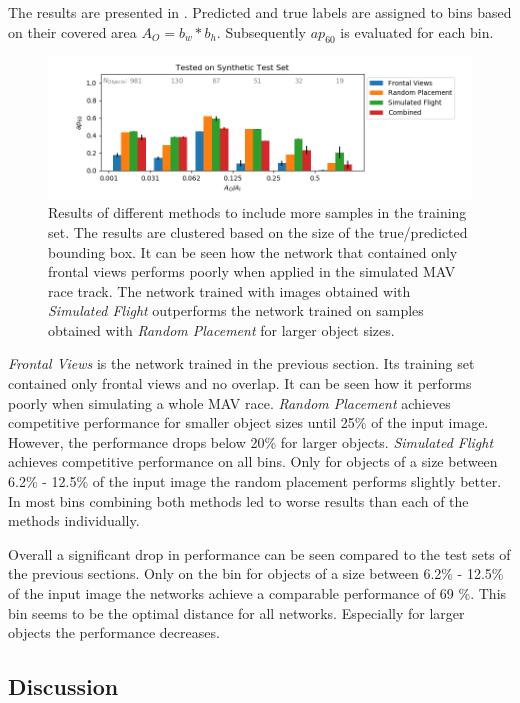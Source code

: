 The results are presented in . Predicted and true labels are assigned to bins based on their covered area $A_O=b_w*b_h$. Subsequently $ap_{60}$ is evaluated for each bin. 
	\begin{figure}[hbtp]
	\includegraphics[width=\textwidth]{fig/view_size}
	\caption{Results of different methods to include more samples in the training set. The results are clustered based on the size of the true/predicted bounding box. It can be seen how the network that contained only frontal views performs poorly when applied in the simulated \ac{MAV} race track. The network trained with images obtained with \textit{Simulated Flight} outperforms the network trained on samples obtained with \textit{Random Placement} for larger object sizes.}
	\label{fig:view_size}
\end{figure}


\textit{Frontal Views} is the network trained in the previous section. Its training set contained only frontal views and no overlap. It can be seen how it performs poorly when simulating a whole \ac{MAV} race. \textit{Random Placement} achieves competitive performance for smaller object sizes until 25\% of the input image. However, the performance drops below 20\% for larger objects. \textit{Simulated Flight} achieves competitive performance on all bins. Only for objects of a size between 6.2\% - 12.5\% of the input image the random placement performs slightly better. In most bins combining both methods led to worse results than each of the methods individually.

Overall a significant drop in performance can be seen compared to the test sets of the previous sections. Only on the bin for objects of a size between 6.2\% - 12.5\% of the input image the networks achieve a comparable performance of 69 \%. This bin seems to be the optimal distance for all networks. Especially for larger objects the performance decreases.

\subsection{Discussion}

